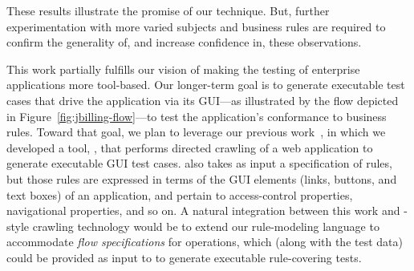 These results illustrate the promise of our technique. But, further
experimentation with more varied subjects and business rules are required to
confirm the generality of, and increase confidence in, these observations.

This work partially fulfills our vision of making the testing of enterprise
applications more tool-based. Our longer-term goal is to generate executable
test cases that drive the application via its GUI---as illustrated by the flow
depicted in Figure~\ref{fig:jbilling-flow}---to test the application's
conformance to business rules. Toward that goal, we plan to leverage our
previous work~\cite{Thummalapenta:2013}, in which we developed a tool, \wateg{},
that performs directed crawling of a web application to generate executable GUI
test cases. \wateg{} also takes as input a specification of rules, but those
rules are expressed in terms of the GUI elements (\eg links, buttons, and text
boxes) of an application, and pertain to access-control properties, navigational
properties, and so on.  A natural integration between this work and
\wateg{}-style crawling technology would be to extend our rule-modeling language
to accommodate \textit{flow specifications} for operations, which (along with
the test data) could be provided as input to \wateg{} to generate executable
rule-covering tests.
